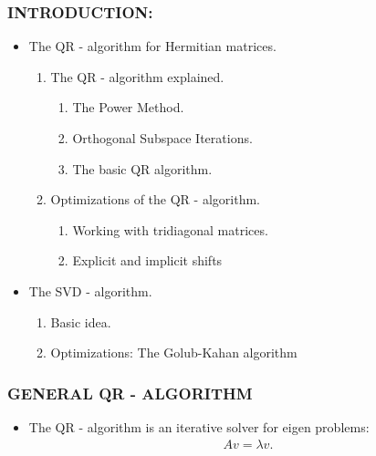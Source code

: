 \documentclass[a4paper,8pt]{beamer} %
\begin{document}



\begin{frame}  %
\frametitle{INTRODUCTION:}
\begin{itemize}
\item The QR - algorithm for Hermitian matrices.
	\begin{enumerate}
		\item The QR - algorithm explained.
			\begin{enumerate}[$\bullet$]
				\item The Power Method.
				\item Orthogonal Subspace Iterations.
				\item The basic QR algorithm.
			\end{enumerate}		
		\item Optimizations of the QR - algorithm.
			\begin{enumerate}[$\bullet$]
				\item Working with tridiagonal matrices.
				\item Explicit and implicit shifts
			\end{enumerate}
	\end{enumerate}
\item The SVD - algorithm. 
	\begin{enumerate}
		\item Basic idea.
		\item Optimizations: The Golub-Kahan algorithm
	\end{enumerate}
\end{itemize}
\end{frame} %
\begin{frame}%
	\frametitle{GENERAL QR - ALGORITHM}
	\begin{itemize}
		\item 
			The QR - algorithm is an iterative solver for eigen problems:
			\begin{align}
				Av=\lambda v.
			\end{align}
	\end{itemize}
\end{frame}%
\end{document}
